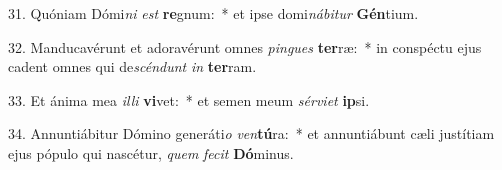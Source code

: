 31. Quóniam Dómi\textit{ni} \textit{est} \textbf{re}gnum:~*  et ipse domi\textit{ná}\textit{bi}\textit{tur} \textbf{Gén}tium.\

32. Manducavérunt et adoravérunt omnes \textit{pin}\textit{gues} \textbf{ter}ræ:~*  in conspéctu ejus cadent omnes qui de\textit{scén}\textit{dunt} \textit{in} \textbf{ter}ram.\

33. Et ánima mea \textit{il}\textit{li} \textbf{vi}vet:~*  et semen meum \textit{sér}\textit{vi}\textit{et} \textbf{ip}si.\

34. Annuntiábitur Dómino generáti\textit{o} \textit{ven}\textbf{tú}ra:~*  et annuntiábunt cæli justítiam ejus pópulo qui nascétur, \textit{quem} \textit{fe}\textit{cit} \textbf{Dó}minus.\

